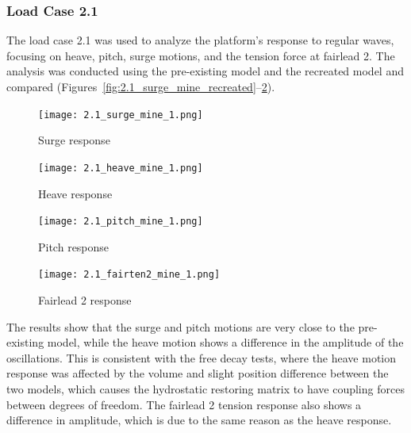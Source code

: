 \documentclass[a4paper, 11pt]{article}
\begin{document}
\subsubsection{Load Case 2.1}
\hspace*{0.5cm}The load case 2.1 was used to analyze the platform’s response to regular waves, focusing on heave, pitch, surge motions, and the tension force at fairlead 2. The analysis was conducted using the pre-existing model and the recreated model and compared (Figures~\ref{fig:2.1_surge_mine_recreated}--\ref{fig:2.1_fairten2_mine_recreated}).

\begin{figure}[H]
    \begin{minipage}{0.48\textwidth}
        \centering
        \texttt{[image: 2.1\_surge\_mine\_1.png]}
        \caption{\small Surge response}
        \label{fig:2.1_surge_mine_recreated}
    \end{minipage}
    \hfill
    \begin{minipage}{0.5\textwidth}
        \centering
        \texttt{[image: 2.1\_heave\_mine\_1.png]}
        \caption{\small Heave response}
        \label{fig:2.1_heave_mine_recreated}
    \end{minipage}
\end{figure}

\begin{figure}[H]
    \begin{minipage}{0.48\textwidth}
        \centering
        \texttt{[image: 2.1\_pitch\_mine\_1.png]}
        \caption{\small Pitch response}
        \label{fig:2.1_pitch_mine_recreated}
    \end{minipage}
    \hfill
    \begin{minipage}{0.5\textwidth}
        \centering
        \texttt{[image: 2.1\_fairten2\_mine\_1.png]}
        \caption{\small Fairlead 2 response}
        \label{fig:2.1_fairten2_mine_recreated}
    \end{minipage}
\end{figure}

The results show that the surge and pitch motions are very close to the pre-existing model, while the heave motion shows a difference in the amplitude of the oscillations. This is consistent with the free decay tests, where the heave motion response was affected by the volume and slight position difference between the two models, which causes the hydrostatic restoring matrix to have coupling forces between degrees of freedom. The fairlead 2 tension response also shows a difference in amplitude, which is due to the same reason as the heave response.
\end{document}
